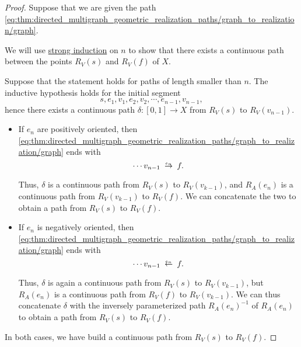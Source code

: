 \begin{proof}
   Suppose that we are given the path \eqref{eq:thm:directed_multigraph_geometric_realization_paths/graph_to_realization/graph}.

  We will use \hyperref[con:induction/well_founded]{strong induction} on \( n \) to show that there exists a continuous path between the points \( R_V(s) \) and \( R_V(f)  \) of \( X \).

  Suppose that the statement holds for paths of length smaller than \( n \). The inductive hypothesis holds for the initial segment
  \begin{equation*}
    s, e_1, v_1, e_2, v_2, \cdots, e_{n-1}, v_{n-1},
  \end{equation*}
  hence there exists a continuous path \( \delta: [0, 1] \to X \) from \( R_V(s) \) to \( R_V(v_{n-1}) \).

  \begin{itemize}
    \item If \( e_n \) are positively oriented, then \eqref{eq:thm:directed_multigraph_geometric_realization_paths/graph_to_realization/graph} ends with
    \begin{equation*}
      \cdots v_{n-1} \reloset{e_n} \to f.
    \end{equation*}

    Thus, \( \delta \) is a continuous path from \( R_V(s) \) to \( R_V(v_{k-1}) \), and \( R_A(e_n) \) is a continuous path from \( R_V(v_{k-1}) \) to \( R_V(f) \). We can concatenate the two to obtain a path from \( R_V(s)  \) to \( R_V(f) \).

    \item If \( e_n \) is negatively oriented, then \eqref{eq:thm:directed_multigraph_geometric_realization_paths/graph_to_realization/graph} ends with
    \begin{equation*}
      \cdots v_{n-1} \reloset{e_n} \leftarrow f.
    \end{equation*}

    Thus, \( \delta \) is again a continuous path from \( R_V(s) \) to \( R_V(v_{k-1}) \), but \( R_A(e_n) \) is a continuous path from \( R_V(f) \) to \( R_V(v_{k-1}) \). We can thus concatenate \( \delta \) with the inversely parameterized path \( R_A(e_n)^{-1} \) of \( R_A(e_n) \) to obtain a path from \( R_V(s) \) to \( R_V(f) \).
  \end{itemize}

  In both cases, we have build a continuous path from \( R_V(s) \) to \( R_V(f)  \).


\end{proof}
